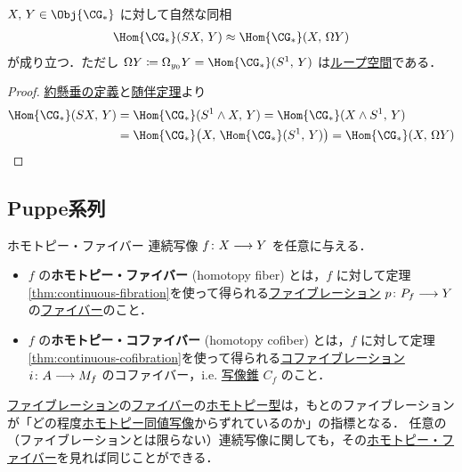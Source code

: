 \documentclass[algtopo_main]{subfiles}
\begin{document}
\begin{myprop}[label=prop:loop-susp]{}
    $X,\, Y \in \Obj{\CG_*}$ に対して自然な同相
    \begin{align}
        \Hom{\CG_*} (SX,\, Y) \approx \Hom{\CG_*} (X,\, \Omega Y)
    \end{align}
    が成り立つ．ただし $\Omega Y \coloneqq \Omega_{y_0} Y = \Hom{\CG_*}(S^1,\, Y)$ は\hyperref[def:path-loop]{ループ空間}である．
\end{myprop}

\begin{proof}
    \hyperref[def:suspension]{約懸垂の定義}と\hyperref[prop:adjoint-b]{随伴定理}より
    \begin{align}
        \Hom{\CG_*} (SX,\, Y) &= \Hom{\CG_*} (S^1 \wedge X,\, Y) = \Hom{\CG_*} (X \wedge S^1,\, Y ) \\
        &= \Hom{\CG_*} \bigl( X,\, \Hom{\CG_*}(S^1,\, Y) \bigr) = \Hom{\CG_*} (X,\, \Omega Y)
    \end{align}
\end{proof}

\subsection{Puppe系列}

\begin{mydef}[label=def:homotopy-fiber]{ホモトピー・ファイバー}
    連続写像 $f \colon X \longrightarrow Y$ を任意に与える．
    \begin{itemize}
        \item $f$ の\textbf{ホモトピー・ファイバー} (homotopy fiber) とは，$f$ に対して定理\ref{thm:continuous-fibration}を使って得られる\hyperref[def:fibration]{ファイブレーション} $p \colon P_f \longrightarrow Y$ の\hyperref[thm:fiber-basic]{ファイバー}のこと．
        \item $f$ の\textbf{ホモトピー・コファイバー} (homotopy cofiber) とは，$f$ に対して定理\ref{thm:continuous-cofibration}を使って得られる\hyperref[def:cofibration]{コファイブレーション} $i \colon A \longrightarrow M_f$ のコファイバー，i.e. \hyperref[def:cylinder-cone]{写像錐} $C_f$ のこと．
    \end{itemize}
\end{mydef}

\hyperref[def:fibration]{ファイブレーション}の\hyperref[thm:fiber-basic]{ファイバー}の\hyperref[def:homotopy-basic]{ホモトピー型}は，もとのファイブレーションが「どの程度\hyperref[def:homotopy-basic]{ホモトピー同値写像}からずれているのか」の指標となる．
任意の（ファイブレーションとは限らない）連続写像に関しても，その\hyperref[def:homotopy-fiber]{ホモトピー・ファイバー}を見れば同じことができる．
\end{document}
